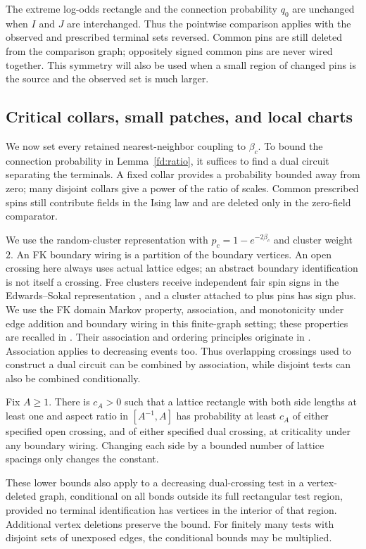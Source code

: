 \begin{remark}\label{fd:symmetric-terminals}
The extreme log-odds rectangle and the connection probability $q_0$
are unchanged when $I$ and $J$ are interchanged. Thus the pointwise
comparison applies with the observed and prescribed terminal sets
reversed. Common pins are still deleted from the comparison graph;
oppositely signed common pins are never wired together. This symmetry
will also be used when a small region of changed pins is the source
and the observed set is much larger.
\end{remark}

\subsection{Critical collars, small patches, and local charts}

We now set every retained nearest-neighbor coupling to $\beta_c$.
To bound the connection probability in Lemma~\ref{fd:ratio}, it suffices
to find a dual circuit separating the terminals. A fixed collar provides
a probability bounded away from zero; many disjoint collars give a power
of the ratio of scales. Common prescribed spins still contribute fields
in the Ising law and are deleted only in the zero-field comparator.

We use the random-cluster representation with
\(p_c=1-e^{-2\beta_c}\) and cluster weight \(2\).  An FK boundary wiring is
a partition of the boundary vertices.  An open crossing here always uses
actual lattice edges; an abstract boundary identification is not itself a
crossing.  Free clusters receive independent fair spin signs in the
Edwards--Sokal representation \cite{EdwardsSokal1988}, and a cluster attached to plus pins has sign
plus.
We use the FK domain Markov property, association, and monotonicity
under edge addition and boundary wiring in this finite-graph setting;
these properties are recalled in \cite[Section~2]{DHN2011}. Their
association and ordering principles originate in
\cite{FKG1971,Holley1974}.
Association applies to decreasing events too.  Thus overlapping
crossings used to construct a dual circuit can be combined by
association, while disjoint tests can also be combined conditionally.

\begin{lemma}\label{fd:conditional-rsw}
Fix \(A\ge1\).  There is \(c_A>0\) such that a lattice rectangle with both
side lengths at least one and aspect ratio in \([A^{-1},A]\) has probability
at least \(c_A\) of either specified open crossing, and of either specified
dual crossing, at criticality under any boundary wiring.  Changing each
side by a bounded number of lattice spacings only changes the constant.

These lower bounds also apply to a decreasing dual-crossing test in a
vertex-deleted graph, conditional on all bonds outside its full rectangular
test region, provided no terminal identification has vertices in the
interior of that region.  Additional vertex deletions preserve the bound.
For finitely many tests with disjoint sets of unexposed edges, the conditional
bounds may be multiplied.
\end{lemma}

